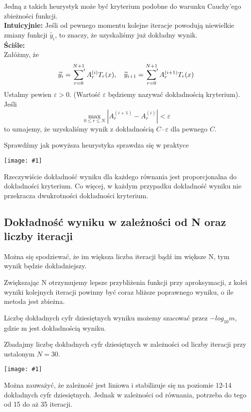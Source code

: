 \documentclass{article}
\newcommand{\plot}[1] {
	\texttt{[image: \#1]}
}
\newcommand{\sumprim}[3] {
	\sideset{}{'}\sum_{#1}^{#2} #3
}
\begin{document}
\par Jedną z takich heurystyk może być kryterium podobne do warunku Cauchy'ego zbieżności funkcji. \\
\textbf{Intuicyjnie:} Jeśli od pewnego momentu kolejne iteracje powodują niewielkie zmiany funkcji $\widetilde{y_i} $, to znaczy, że uzyskaliśmy już dokładny wynik. \\
\textbf{Ściśle:} \\
	Załóżmy, że
	$$ \widetilde{y_i} = \sumprim{r=0}{N+1}{A_r^{(i)} T_r(x)}, \quad  \widetilde{y}_{i+1} = \sumprim{r=0}{N+1}{A_r^{(i+1)} T_r(x)}$$
	Ustalmy pewien $\varepsilon > 0$. (Wartość $\varepsilon$ będziemy nazywać dokładnością kryterium).\\
	Jeśli
	$$ \max_{0 \le r \le N} | A_r^{(i+1)} - A_r^{(i)} | < \varepsilon$$
	to uznajemy, że uzyskaliśmy wynik z dokładnością $C \cdot \varepsilon$ dla pewnego $C$. 
	
	
\par Sprawdźmy jak powyższa heurystyka sprawdza się w praktyce

\plot{kryterium.png}

Rzeczywiście dokładność wyniku dla każdego równania jest proporcjonalna do dokładności kryterium. Co więcej, w każdym przypadku dokładność wyniku nie przekracza dwukrotności dokładności kryterium.


\subsection{Dokładność wyniku w zależności od N oraz liczby iteracji}

\par Można się spodziewać, że im większa liczba iteracji bądź im większe N, tym wynik będzie dokładniejszy. 

\par Zwiększając N otrzymujemy lepsze przybliżenia funkcji przy aproksymacji, z kolei wyniki kolejnych iteracji powinny być coraz bliższe poprawnego wyniku, o ile metoda jest zbieżna.

\par Liczbę dokładnych cyfr dziesiętnych wyniku możemy szacować przez $ -log_{10} m $, gdzie m jest dokładnością wyniku.
\par Zbadajmy liczbę dokładnych cyfr dziesiętnych w zależności od liczby iteracji przy ustalonym $N = 30$.

\plot{iters.png}

\par Można zauważyć, że zależność jest liniowa i stabilizuje się na poziomie 12-14 dokładnych cyfr dziesiętnych. Jednak w zależności od równania, potrzeba do tego od 15 do aż 35 iteracji. 
\end{document}
